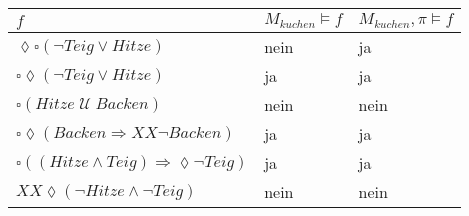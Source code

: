 \documentclass[10pt,a4paper,oneside,ngerman,numbers=noenddot]{scrartcl}
\begin{document}
\section{} %
	\begin{tabular}{l|l|l}
		\(f\) & \(M_{kuchen} \models f \) & \(M_{kuchen}, \pi \models f\)\\
		\hline
		\(\lozenge \square(\lnot Teig \vee Hitze) \)& nein & ja \\
		\(\square	\lozenge(\lnot Teig \vee Hitze)\) & ja & ja \\
		\(\square	(Hitze \;\mathcal{U}\; Backen)\) & nein & nein \\
		\(\square	\lozenge (Backen \Rightarrow XX\lnot Backen)\) & ja & ja \\
		\(\square ((Hitze \wedge Teig) \Rightarrow \lozenge \lnot Teig)\) & ja & ja \\
		\(XX \lozenge (\lnot Hitze \wedge \lnot Teig)\) & nein & nein  
	\end{tabular}
\end{document}
